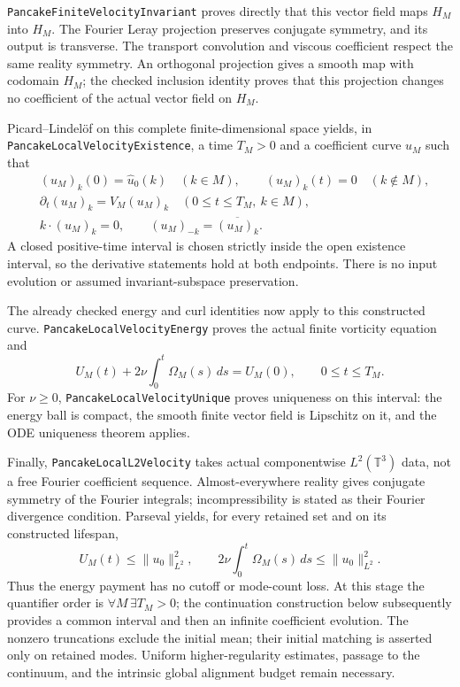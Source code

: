 \documentclass[11pt]{article}
\theoremstyle{definition}
\begin{document}
\texttt{PancakeFiniteVelocityInvariant} proves directly that this vector
field maps $H_M$ into $H_M$. The Fourier Leray projection preserves
conjugate symmetry, and its output is transverse. The transport
convolution and viscous coefficient respect the same reality symmetry.
An orthogonal projection gives a smooth map with codomain $H_M$; the
checked inclusion identity proves that this projection changes no
coefficient of the actual vector field on $H_M$.

Picard--Lindel\"of on this complete finite-dimensional space yields, in
\texttt{PancakeLocalVelocityExistence}, a time $T_M>0$ and a coefficient
curve $u_M$ such that
\[
 \begin{split}
 &(u_M)_k(0)=\widehat u_0(k)\quad(k\in M),\qquad
   (u_M)_k(t)=0\quad(k\notin M),\\
 &\partial_t(u_M)_k=V_M(u_M)_k\quad(0\le t\le T_M,\ k\in M),\\
 &k\cdot(u_M)_k=0,\qquad (u_M)_{-k}=\overline{(u_M)_k}.
 \end{split}
\]
A closed positive-time interval is chosen strictly inside the open
existence interval, so the derivative statements hold at both endpoints.
There is no input evolution or assumed invariant-subspace preservation.

The already checked energy and curl identities now apply to this
constructed curve. \texttt{PancakeLocalVelocityEnergy} proves the actual
finite vorticity equation and
\[
 U_M(t)+2\nu\int_0^t\Omega_M(s)\,ds=U_M(0),\qquad 0\le t\le T_M.
\]
For $\nu\ge0$, \texttt{PancakeLocalVelocityUnique} proves uniqueness on
this interval: the energy ball is compact, the smooth finite vector
field is Lipschitz on it, and the ODE uniqueness theorem applies.

Finally, \texttt{PancakeLocalL2Velocity} takes actual componentwise
$L^2(\mathbb T^3)$ data, not a free Fourier coefficient sequence.
Almost-everywhere reality gives conjugate symmetry of the Fourier
integrals; incompressibility is stated as their Fourier divergence
condition. Parseval yields, for every retained set and on its constructed
lifespan,
\[
 U_M(t)\le\|u_0\|_{L^2}^2,\qquad
 2\nu\int_0^t\Omega_M(s)\,ds\le\|u_0\|_{L^2}^2.
\]
Thus the energy payment has no cutoff or mode-count loss. At this stage
the quantifier order is $\forall M\,\exists T_M>0$; the continuation
construction below subsequently provides a common interval and then an
infinite coefficient evolution. The nonzero
truncations exclude the initial mean; their initial
matching is asserted only on retained modes. Uniform higher-regularity
estimates, passage to the continuum, and the intrinsic global alignment
budget remain necessary.
\end{document}

